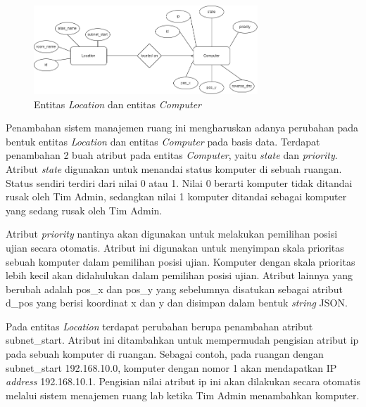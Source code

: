 \documentclass[a4paper,twoside]{article}
\begin{document}
\begin{enumerate}
\begin{itemize}
\begin{itemize}
                     \begin{figure}[H]
                        \centering
                        \includegraphics[width=0.75\textwidth]{images/db-loca-comp.png}
                        \caption{Entitas \textit{Location} dan entitas \textit{Computer}}
                        \label{fig:entiti-location-computer}
                    \end{figure}
                    
                    
            		Penambahan sistem manajemen ruang ini mengharuskan adanya perubahan pada bentuk entitas \textit{Location} dan entitas \textit{Computer} pada basis data. Terdapat penambahan 2 buah atribut pada entitas \textit{Computer}, yaitu \textit{state} dan \textit{priority}. Atribut \textit{state} digunakan untuk menandai status komputer di sebuah ruangan. Status sendiri terdiri dari nilai 0 atau 1. Nilai 0 berarti komputer tidak ditandai rusak oleh Tim Admin, sedangkan nilai 1 komputer ditandai sebagai komputer yang sedang rusak oleh Tim Admin. 
            		
            		Atribut \textit{priority} nantinya akan digunakan untuk melakukan pemilihan posisi ujian secara otomatis. Atribut ini digunakan untuk menyimpan skala prioritas sebuah komputer dalam pemilihan posisi ujian. Komputer dengan skala prioritas lebih kecil akan didahulukan dalam pemilihan posisi ujian.
            		 Atribut lainnya yang berubah adalah pos\_x dan pos\_y yang sebelumnya disatukan sebagai atribut d\_pos yang berisi koordinat x dan y dan disimpan dalam bentuk \textit{string} JSON.
            		 
            		 Pada entitas \textit{Location} terdapat perubahan berupa penambahan atribut subnet\_start. Atribut ini ditambahkan untuk mempermudah pengisian atribut ip pada sebuah komputer di ruangan. Sebagai contoh, pada ruangan dengan subnet\_start 192.168.10.0, komputer dengan nomor 1 akan mendapatkan IP \textit{address} 192.168.10.1. Pengisian nilai atribut ip ini akan dilakukan secara otomatis melalui sistem menajemen ruang lab ketika Tim Admin menambahkan komputer.
            		 

\end{itemize}
\end{itemize}
\end{enumerate}
\end{document}

